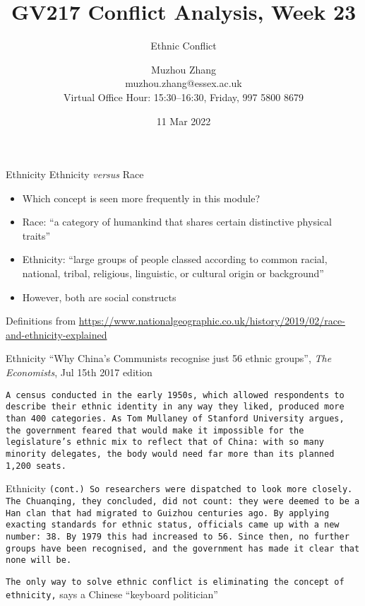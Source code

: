\documentclass{beamer}
\title{GV217 Conflict Analysis, Week 23}
\subtitle{Ethnic Conflict}
\author{Muzhou Zhang\\ muzhou.zhang@essex.ac.uk\\ Virtual Office Hour: 15:30--16:30, Friday, 997 5800 8679}
\date{11 Mar 2022}
\begin{document}
\maketitle
{}

\begin{frame}{Ethnicity}
    \pause Ethnicity \textit{versus} Race
    \begin{itemize}
        \pause\item Which concept is seen more frequently in this module?
        \pause\item Race: ``a category of humankind that shares certain distinctive physical traits''
        \pause\item Ethnicity: ``large groups of people classed according to common racial, national, tribal, religious, linguistic, or cultural origin or background''
        \pause\item However, both are social constructs
    \end{itemize}
    \vfill
    \tiny Definitions from \url{https://www.nationalgeographic.co.uk/history/2019/02/race-and-ethnicity-explained}
\end{frame}

\begin{frame}{Ethnicity}
    \pause ``Why China's Communists recognise just 56 ethnic groups'', \textit{The Economists}, Jul 15th 2017 edition
    \vspace{30pt}

    \pause\texttt{\scriptsize A census conducted in the early 1950s, which allowed respondents to describe their ethnic identity in any way they liked, produced more than 400 categories. As Tom Mullaney of Stanford University argues, the government feared that would make it impossible for the legislature's ethnic mix to reflect that of China: with so many minority delegates, the body would need far more than its planned 1,200 seats.}
\end{frame}

\begin{frame}{Ethnicity}
    \pause\texttt{\scriptsize (cont.) So researchers were dispatched to look more closely. The Chuanqing, they concluded, did not count: they were deemed to be a Han clan that had migrated to Guizhou centuries ago. By applying exacting standards for ethnic status, officials came up with a new number: 38. By 1979 this had increased to 56. Since then, no further groups have been recognised, and the government has made it clear that none will be.}
    \vspace{15pt}

    \pause\texttt{The only way to solve ethnic conflict is eliminating the concept of ethnicity,} says a Chinese ``keyboard politician''
\end{frame}
\end{document}
